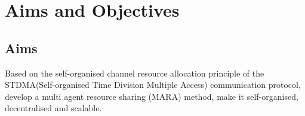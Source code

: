 \documentclass[12pt, oneside]{article}
\begin{document}
\begin{titlepage}
\begin{center}
{        \vspace{0.8cm}
 
        \vspace{0.8cm}
        \today
        
    \end{center}}
    
\end{titlepage}

\tableofcontents
\pagebreak


\section{Aims and Objectives}
\subsection{Aims}
Based on the self-organised channel resource allocation principle of the STDMA(Self-organised Time Division Multiple Access) \cite{STDMA} communication protocol, develop a multi agent resource sharing (MARA) \cite{MARA_Overview1} method, make it self-organised, decentralised and scalable. 
\end{document}
